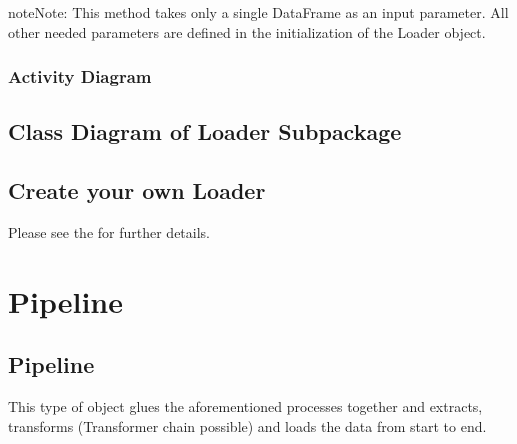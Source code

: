 \documentclass[a4paper,10pt, twoside,english]{sphinxmanual}
\begin{document}
\begin{fulllineitems}
\begin{fulllineitems}
\begin{quote}
\begin{description}
\end{description}\end{quote}

\begin{sphinxadmonition}{note}{Note:}
This method takes only a single DataFrame as an input parameter. All other needed
parameters are defined in the initialization of the Loader object.
\end{sphinxadmonition}

\end{fulllineitems}


\end{fulllineitems}



\subsubsection{Activity Diagram}
\label{\detokenize{loader/hive_loader:activity-diagram}}
\noindent{}


\subsection{Class Diagram of Loader Subpackage}
\label{\detokenize{loader/overview:class-diagram-of-loader-subpackage}}
\noindent{}


\subsection{Create your own Loader}
\label{\detokenize{loader/overview:create-your-own-loader}}
Please see the {\hyperref[\detokenize{base_classes/loader:custom-loader}]{}} for further details.


\section{Pipeline}
\label{\detokenize{pipeline/overview:pipeline}}\label{\detokenize{pipeline/overview::doc}}

\subsection{Pipeline}
\label{\detokenize{pipeline/pipeline:module-spooq2.pipeline.pipeline}}\label{\detokenize{pipeline/pipeline:pipeline}}\label{\detokenize{pipeline/pipeline::doc}}
This type of object glues the aforementioned processes together and  extracts, transforms
(Transformer chain possible) and loads the data from start to end.
\end{document}
